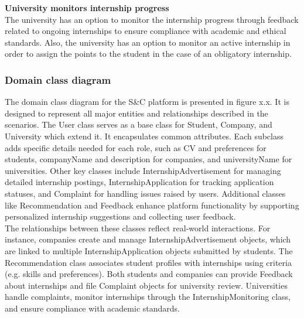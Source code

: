 \textbf{University monitors internship progress}\\
The university has an option to monitor the internship progress through feedback related to ongoing internships to ensure compliance with academic and ethical standards. Also, the university has an option to monitor an active internship in order to assign the points to the student in the case of an obligatory internship. \\




\subsubsection{Domain class diagram}

\quad The domain class diagram for the S\&C platform is presented in figure x.x. It is designed to represent all major entities and relationships described in the scenarios. The User class serves as a base class for Student, Company, and University which extend it. It encapsulates common attributes. Each subclass adds specific details needed for each role, such as CV and preferences for students, companyName and description for companies, and universityName for universities. Other key classes include InternshipAdvertisement for managing detailed internship postings, InternshipApplication for tracking application statuses, and Complaint for handling issues raised by users. Additional classes like Recommendation and Feedback enhance platform functionality by supporting personalized internship suggestions and collecting user feedback. \\

The relationships between these classes reflect real-world interactions. For instance, companies create and manage InternshipAdvertisement objects, which are linked to multiple InternshipApplication objects submitted by students. The Recommendation class associates student profiles with internships using criteria (e.g. skills and preferences). Both students and companies can provide Feedback about internships and file Complaint objects for university review. Universities handle complaints, monitor internships through the InternshipMonitoring class, and ensure compliance with academic standards.

